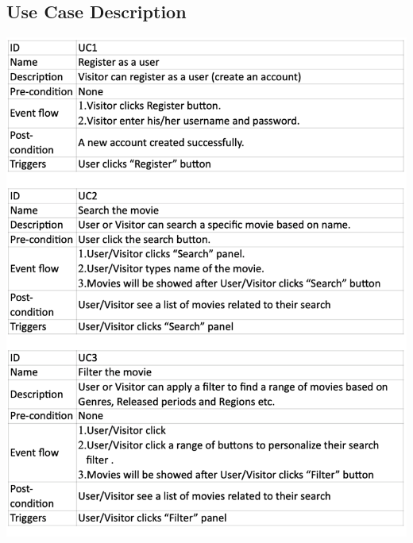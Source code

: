 \documentclass[12pt]{article}
\begin{document}
\subsection{Use Case Description}
\includegraphics[width=1\linewidth]{UD1.png}\\
\newpage
\end{document}
